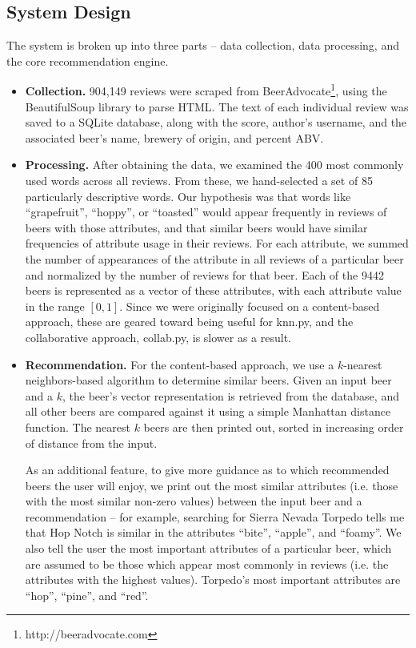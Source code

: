 \documentclass[11pt]{article}
\begin{document}


\subsection*{System Design}
The system is broken up into three parts -- data collection, data processing, and the core recommendation engine.
\begin{itemize}
\item \textbf{Collection.} 904,149 reviews were scraped from BeerAdvocate\footnote{http://beeradvocate.com}, using the BeautifulSoup library to parse HTML. The text of each individual review was saved to a SQLite database, along with the score, author's username, and the associated beer's name, brewery of origin, and percent ABV.

\item \textbf{Processing.} After obtaining the data, we examined the 400 most commonly used words across all reviews. From these, we hand-selected a set of 85 particularly descriptive words. Our hypothesis was that words like ``grapefruit'', ``hoppy'', or ``toasted'' would appear frequently in reviews of beers with those attributes, and that similar beers would have similar frequencies of attribute usage in their reviews. For each attribute, we summed the number of appearances of the attribute in all reviews of a particular beer and normalized by the number of reviews for that beer. Each of the 9442 beers is represented as a vector of these attributes, with each attribute value in the range $[0, 1]$. Since we were originally focused on a content-based approach, these are geared toward being useful for knn.py, and the collaborative approach, collab.py, is slower as a result.
\item \textbf{Recommendation.} For the content-based approach, we use a $k$-nearest neighbors-based algorithm to determine similar beers. Given an input beer and a $k$, the beer's vector representation is retrieved from the database, and all other beers are compared against it using a simple Manhattan distance function. The nearest $k$ beers are then printed out, sorted in increasing order of distance from the input. 

As an additional feature, to give more guidance as to which recommended beers the user will enjoy, we print out the most similar attributes (i.e. those with the most similar non-zero values) between the input beer and a recommendation -- for example, searching for Sierra Nevada Torpedo tells me that Hop Notch is similar in the attributes ``bite'', ``apple'', and ``foamy''. We also tell the user the most important attributes of a particular beer, which are assumed to be those which appear most commonly in reviews (i.e. the attributes with the highest values). Torpedo's most important attributes are ``hop'', ``pine'', and ``red''.


\end{itemize}
\end{document}
